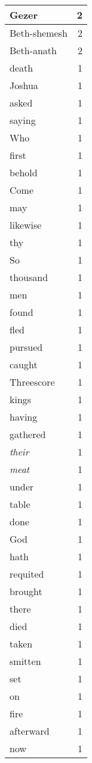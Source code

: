 \begin{center}
\begin{longtable}{l|r}
Gezer & 2 \\ \hline
Beth-shemesh & 2 \\ \hline
Beth-anath & 2 \\ \hline
death & 1 \\ \hline
Joshua & 1 \\ \hline
asked & 1 \\ \hline
saying & 1 \\ \hline
Who & 1 \\ \hline
first & 1 \\ \hline
behold & 1 \\ \hline
Come & 1 \\ \hline
may & 1 \\ \hline
likewise & 1 \\ \hline
thy & 1 \\ \hline
So & 1 \\ \hline
thousand & 1 \\ \hline
men & 1 \\ \hline
found & 1 \\ \hline
fled & 1 \\ \hline
pursued & 1 \\ \hline
caught & 1 \\ \hline
Threescore & 1 \\ \hline
kings & 1 \\ \hline
having & 1 \\ \hline
gathered & 1 \\ \hline
\emph{their} & 1 \\ \hline
\emph{meat} & 1 \\ \hline
under & 1 \\ \hline
table & 1 \\ \hline
done & 1 \\ \hline
God & 1 \\ \hline
hath & 1 \\ \hline
requited & 1 \\ \hline
brought & 1 \\ \hline
there & 1 \\ \hline
died & 1 \\ \hline
taken & 1 \\ \hline
smitten & 1 \\ \hline
set & 1 \\ \hline
on & 1 \\ \hline
fire & 1 \\ \hline
afterward & 1 \\ \hline
now & 1 \\ \hline

\end{longtable}
\end{center}
